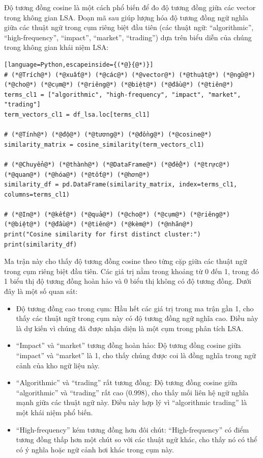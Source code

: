 Độ tương đồng cosine là một cách phổ biến để đo độ tương đồng giữa các vector trong không gian LSA. Đoạn mã sau giúp lượng hóa độ tương đồng ngữ nghĩa giữa các thuật ngữ trong cụm riêng biệt đầu tiên (các thuật ngữ: ``algorithmic'', ``high-frequency'', ``impact'', ``market'', ``trading'') dựa trên biểu diễn của chúng trong không gian khái niệm LSA:

\begin{lstlisting}[language=Python,escapeinside={(*@}{@*)}]
# (*@Trích@*) (*@xuất@*) (*@các@*) (*@vector@*) (*@thuật@*) (*@ngữ@*) (*@cho@*) (*@cụm@*) (*@riêng@*) (*@biệt@*) (*@đầu@*) (*@tiên@*)
terms_cl1 = ["algorithmic", "high-frequency", "impact", "market", "trading"]
term_vectors_cl1 = df_lsa.loc[terms_cl1]

# (*@Tính@*) (*@độ@*) (*@tương@*) (*@đồng@*) (*@cosine@*)
similarity_matrix = cosine_similarity(term_vectors_cl1)

# (*@Chuyển@*) (*@thành@*) (*@DataFrame@*) (*@để@*) (*@trực@*) (*@quan@*) (*@hóa@*) (*@tốt@*) (*@hơn@*)
similarity_df = pd.DataFrame(similarity_matrix, index=terms_cl1, columns=terms_cl1)

# (*@In@*) (*@kết@*) (*@quả@*) (*@cho@*) (*@cụm@*) (*@riêng@*) (*@biệt@*) (*@đầu@*) (*@tiên@*) (*@kèm@*) (*@nhãn@*)
print("Cosine similarity for first distinct cluster:")
print(similarity_df)
\end{lstlisting}

Ma trận này cho thấy độ tương đồng cosine theo từng cặp giữa các thuật ngữ trong cụm riêng biệt đầu tiên. Các giá trị nằm trong khoảng từ 0 đến 1, trong đó 1 biểu thị độ tương đồng hoàn hảo và 0 biểu thị không có độ tương đồng. Dưới đây là một số quan sát:

\begin{itemize}
  \item Độ tương đồng cao trong cụm: Hầu hết các giá trị trong ma trận gần 1, cho thấy các thuật ngữ trong cụm này có độ tương đồng ngữ nghĩa cao. Điều này là dự kiến vì chúng đã được nhận diện là một cụm trong phân tích LSA.
  \item ``Impact'' và ``market'' tương đồng hoàn hảo: Độ tương đồng cosine giữa ``impact'' và ``market'' là 1, cho thấy chúng được coi là đồng nghĩa trong ngữ cảnh của kho ngữ liệu này.
  \item ``Algorithmic'' và ``trading'' rất tương đồng: Độ tương đồng cosine giữa ``algorithmic'' và ``trading'' rất cao (0.998), cho thấy mối liên hệ ngữ nghĩa mạnh giữa các thuật ngữ này. Điều này hợp lý vì ``algorithmic trading'' là một khái niệm phổ biến.
  \item ``High-frequency'' kém tương đồng hơn đôi chút: ``High-frequency'' có điểm tương đồng thấp hơn một chút so với các thuật ngữ khác, cho thấy nó có thể có ý nghĩa hoặc ngữ cảnh hơi khác trong cụm này.
\end{itemize}

